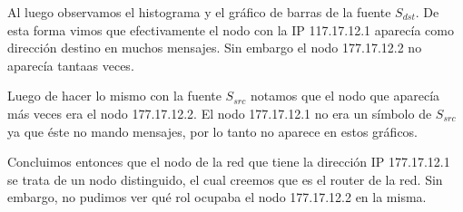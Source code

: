 Al luego observamos el histograma y el gráfico de barras de la fuente $S_{dst}$. De esta forma vimos que efectivamente el nodo con la IP 117.17.12.1 aparecía como dirección destino en muchos mensajes. Sin embargo el nodo 177.17.12.2 no aparecía tantaas veces.

Luego de hacer lo mismo con la fuente $S_{src}$ notamos que el nodo que aparecía más veces era el nodo 177.17.12.2. El nodo 177.17.12.1 no era un símbolo de $S_{src}$ ya que éste no mando mensajes, por lo tanto no aparece en estos gráficos.

Concluimos entonces que el nodo de la red que tiene la dirección IP 177.17.12.1 se trata de un nodo distinguido, el cual creemos que es el router de la red. Sin embargo, no pudimos ver qué rol ocupaba el nodo 177.17.12.2 en la misma.